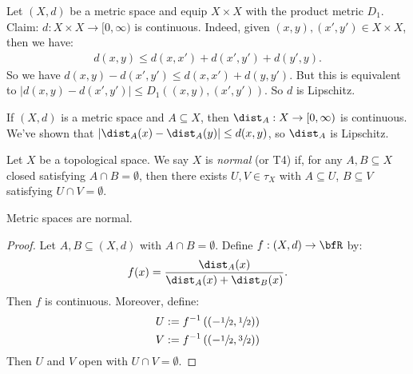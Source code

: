     \begin{example}
        Let $(X,d)$ be a metric space and equip $X \times X$ with the product metric $D_1$. Claim: $d:X \times X \rightarrow [0,\infty)$ is continuous. Indeed, given $(x,y),(x',y') \in X \times X$, then we have:
            \begin{equation*}
            \begin{split}
                d(x,y) \leq d(x,x') + d(x',y') + d(y',y).
            \end{split}
            \end{equation*}
        So we have $d(x,y) - d(x',y') \leq d(x,x') + d(y,y')$. But this is equivalent to $|d(x,y) - d(x',y')| \leq D_1((x,y),(x',y'))$. So $d$ is Lipschitz.
    \end{example}

    \begin{example}
        If $(X,d)$ is a metric space and $A \subseteq X$, then $\dist_A : X \rightarrow [0,\infty)$ is continuous. We've shown that $|\dist_A(x) - \dist_A(y)| \leq d(x,y)$, so $\dist_A$ is Lipschitz.
    \end{example}

    \begin{definition}
        Let $X$ be a topological space. We say $X$ is \textit{normal} (or T4) if, for any $A,B \subseteq X$ closed satisfying $A \cap B = \emptyset$, then there exists $U,V \in \tau_X$ with $A \subseteq U$, $B \subseteq V$ satisfying $U \cap V = \emptyset$.
    \end{definition}

    \begin{proposition}
        Metric spaces are normal.
    \end{proposition}
        \begin{proof}
            Let $A,B \subseteq (X,d)$ with $A \cap B = \emptyset$. Define $f:(X,d) \rightarrow \bfR$ by:
                \begin{equation*}
                \begin{split}
                    f(x) = \frac{\dist_A(x)}{\dist_A(x) + \dist_B(x)}.
                \end{split}
                \end{equation*}
            Then $f$ is continuous. Moreover, define:
                \begin{equation*}
                \begin{split}
                    U &:= f^{-1}\left(\left(-\sfrac{1}{2},\sfrac{1}{2}\right)\right) \\
                    V &:= f^{-1}\left(\left(-\sfrac{1}{2},\sfrac{3}{2}\right)\right)
                \end{split}
                \end{equation*}
            Then $U$ and $V$ open with $U \cap V = \emptyset$.
        \end{proof}

